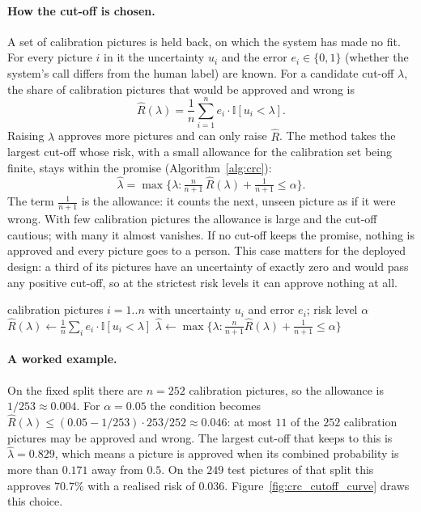 \paragraph{How the cut-off is chosen.} A set of calibration pictures is held back, on which the system has made no fit. For every picture $i$ in it the uncertainty $u_i$ and the error $e_i \in \{0,1\}$ (whether the system's call differs from the human label) are known. For a candidate cut-off $\lambda$, the share of calibration pictures that would be approved and wrong is
\begin{equation}
\hat R(\lambda) = \frac{1}{n}\sum_{i=1}^{n} e_i \cdot \mathbb{I}[u_i < \lambda] .
\end{equation}
Raising $\lambda$ approves more pictures and can only raise $\hat R$. The method takes the largest cut-off whose risk, with a small allowance for the calibration set being finite, stays within the promise (Algorithm~\ref{alg:crc}):
\begin{equation}
\hat\lambda = \max\Big\{\lambda : \tfrac{n}{n+1}\,\hat R(\lambda) + \tfrac{1}{n+1} \le \alpha \Big\} .
\end{equation}
The term $\tfrac{1}{n+1}$ is the allowance: it counts the next, unseen picture as if it were wrong. With few calibration pictures the allowance is large and the cut-off cautious; with many it almost vanishes. If no cut-off keeps the promise, nothing is approved and every picture goes to a person. This case matters for the deployed design: a third of its pictures have an uncertainty of exactly zero and would pass any positive cut-off, so at the strictest risk levels it can approve nothing at all.

\begin{algorithm}[!htbp]
\caption{Choosing the cut-off (conformal risk control \cite{crc2024})}
\label{alg:crc}
\begin{algorithmic}[1]
\Require calibration pictures $i=1..n$ with uncertainty $u_i$ and error $e_i$; risk level $\alpha$
  \State $\hat R(\lambda) \gets \frac{1}{n}\sum_i e_i \cdot \mathbb{I}[u_i < \lambda]$
\EndFor
\State \Return $\hat\lambda \gets \max\{\lambda : \tfrac{n}{n+1}\hat R(\lambda) + \tfrac{1}{n+1} \le \alpha\}$
\end{algorithmic}
\end{algorithm}

\paragraph{A worked example.} On the fixed split there are $n = 252$ calibration pictures, so the allowance is $1/253 \approx 0.004$. For $\alpha = 0.05$ the condition becomes $\hat R(\lambda) \le (0.05 - 1/253)\cdot 253/252 \approx 0.046$: at most $11$ of the $252$ calibration pictures may be approved and wrong. The largest cut-off that keeps to this is $\hat\lambda = 0.829$, which means a picture is approved when its combined probability is more than $0.171$ away from $0.5$. On the $249$ test pictures of that split this approves $70.7\%$ with a realised risk of $0.036$. Figure~\ref{fig:crc_cutoff_curve} draws this choice.

